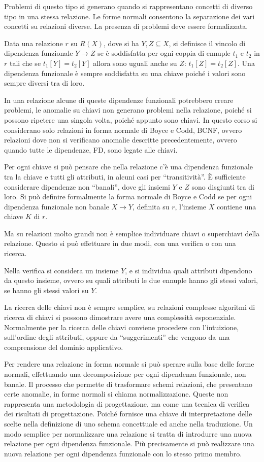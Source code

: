 \documentclass{article}
\numberwithin{equation}{subsection}
\begin{document}
Problemi di questo tipo si generano quando si rappresentano concetti di diverso tipo in una stessa relazione. Le forme normali consentono la separazione dei vari 
concetti su relazioni diverse. La presenza di problemi deve essere formalizzata. 

Data una relazione $r$ su $R(X)$, dove si ha $Y,Z\subseteq X$, si definisce il vincolo di dipendenza funzionale $Y\to Z$ se è soddisfatta per ogni 
coppia di ennuple $t_1$ e $t_2$ in $r$ tali che se $t_1[Y]=t_2[Y]$ allora sono uguali anche su $Z$: $t_1[Z]=t_2[Z]$. 
Una dipendenza funzionale è sempre soddisfatta su una chiave poiché i valori sono sempre diversi tra di loro. 

In una relazione alcune di queste dipendenze funzionali potrebbero creare problemi, le anomalie su chiavi non generano problemi nella relazione, poiché si possono 
ripetere una singola volta, poiché appunto sono chiavi. 
In questo corso si considerano solo relazioni in forma normale di Boyce e Codd, BCNF, ovvero relazioni dove non si verificano anomalie descritte precedentemente, 
ovvero quando tutte le dipendenze, FD, sono legate alle chiavi. 

Per ogni chiave si può pensare che nella relazione c'è una dipendenza funzionale tra la chiave e tutti gli attributi, in alcuni casi per ``transitività''. 
\`{E} sufficiente considerare dipendenze non ``banali'', dove gli insiemi $Y$ e $Z$ sono disgiunti tra di loro. 
Si può definire formalmente la forma normale di Boyce e Codd se per ogni dipendenza funzionale non banale $X\to Y$, definita su $r$, l'insieme $X$ contiene 
una chiave $K$ di $r$. 

Ma su relazioni molto grandi non è semplice individuare chiavi o superchiavi della relazione. Questo si può effettuare in due modi, con una verifica o con una ricerca. 

Nella verifica si considera un insieme $Y$, e si individua quali attributi dipendono da questo insieme, ovvero su quali attributi le due ennuple hanno gli stessi valori, 
se hanno gli stessi valori su $Y$. 

La ricerca delle chiavi non è sempre semplice, su relazioni complesse algoritmi di ricerca di chiavi si possono dimostrare avere una complessità esponenziale. 
Normalmente per la ricerca delle chiavi conviene procedere con l'intuizione, sull'ordine degli attributi, oppure da ``suggerimenti'' che vengono da 
una comprensione del dominio applicativo. 

Per rendere una relazione in forma normale si può sperare sulla base delle forme normali, effettuando una decomposizione per ogni dipendenza funzionale, non 
banale. Il processo che permette di trasformare schemi relazioni, che presentano certe anomalie, in forme normali si chiama normalizzazione. Queste non rappresenta 
una metodologia di progettazione, ma come una tecnica di verifica dei risultati di progettazione. Poiché fornisce una chiave di interpretazione delle scelte nella 
definizione di uno schema concettuale ed anche nella traduzione. 
Un modo semplice per normalizzare una relazione si tratta di introdurre una nuova relazione per ogni dipendenza funzionale. Più precisamente si può realizzare una nuova 
relazione per ogni dipendenza funzionale con lo stesso primo membro. 
\end{document}
